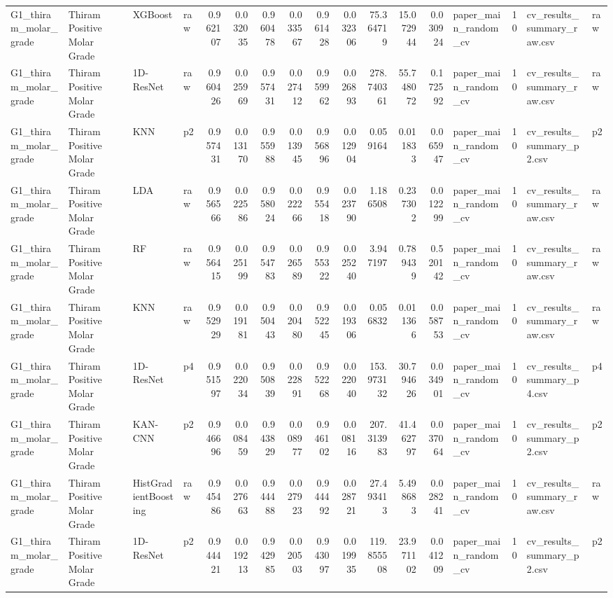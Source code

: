 \begin{tabular}{llllrrrrrrrrrlrll}
G1_thiram_molar_grade & Thiram Positive Molar Grade & XGBoost & raw & 0.962107 & 0.032035 & 0.960478 & 0.033567 & 0.961428 & 0.032306 & 75.364719 & 15.072944 & 0.030924 & paper_main_random_cv & 10 & cv_results_summary_raw.csv & raw \\
G1_thiram_molar_grade & Thiram Positive Molar Grade & 1D-ResNet & raw & 0.960426 & 0.025969 & 0.957431 & 0.027412 & 0.959962 & 0.026893 & 278.740361 & 55.748072 & 0.172592 & paper_main_random_cv & 10 & cv_results_summary_raw.csv & raw \\
G1_thiram_molar_grade & Thiram Positive Molar Grade & KNN & p2 & 0.957431 & 0.013170 & 0.955988 & 0.013945 & 0.956896 & 0.012904 & 0.059164 & 0.011833 & 0.065947 & paper_main_random_cv & 10 & cv_results_summary_p2.csv & p2 \\
G1_thiram_molar_grade & Thiram Positive Molar Grade & LDA & raw & 0.956566 & 0.022586 & 0.958024 & 0.022266 & 0.955418 & 0.023790 & 1.186508 & 0.237302 & 0.012299 & paper_main_random_cv & 10 & cv_results_summary_raw.csv & raw \\
G1_thiram_molar_grade & Thiram Positive Molar Grade & RF & raw & 0.956415 & 0.025199 & 0.954783 & 0.026589 & 0.955322 & 0.025240 & 3.947197 & 0.789439 & 0.520142 & paper_main_random_cv & 10 & cv_results_summary_raw.csv & raw \\
G1_thiram_molar_grade & Thiram Positive Molar Grade & KNN & raw & 0.952929 & 0.019181 & 0.950443 & 0.020480 & 0.952245 & 0.019306 & 0.056832 & 0.011366 & 0.058753 & paper_main_random_cv & 10 & cv_results_summary_raw.csv & raw \\
G1_thiram_molar_grade & Thiram Positive Molar Grade & 1D-ResNet & p4 & 0.951597 & 0.022034 & 0.950839 & 0.022891 & 0.952268 & 0.022040 & 153.973132 & 30.794626 & 0.034901 & paper_main_random_cv & 10 & cv_results_summary_p4.csv & p4 \\
G1_thiram_molar_grade & Thiram Positive Molar Grade & KAN-CNN & p2 & 0.946696 & 0.008459 & 0.943829 & 0.008977 & 0.946102 & 0.008116 & 207.313983 & 41.462797 & 0.037064 & paper_main_random_cv & 10 & cv_results_summary_p2.csv & p2 \\
G1_thiram_molar_grade & Thiram Positive Molar Grade & HistGradientBoosting & raw & 0.945486 & 0.027663 & 0.944488 & 0.027923 & 0.944492 & 0.028721 & 27.493413 & 5.498683 & 0.028241 & paper_main_random_cv & 10 & cv_results_summary_raw.csv & raw \\
G1_thiram_molar_grade & Thiram Positive Molar Grade & 1D-ResNet & p2 & 0.944421 & 0.019213 & 0.942985 & 0.020503 & 0.943097 & 0.019935 & 119.855508 & 23.971102 & 0.041209 & paper_main_random_cv & 10 & cv_results_summary_p2.csv & p2 \\

\end{tabular}
